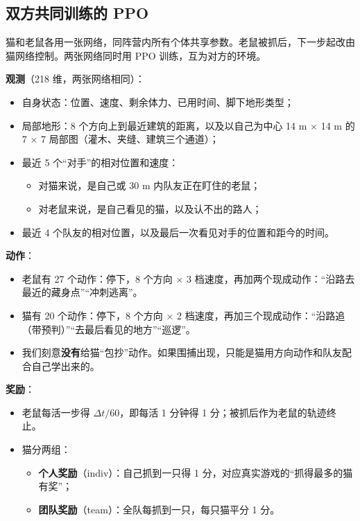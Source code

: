 \documentclass[a4paper,zihao=5,fontset=fandol,UTF8]{ctexart}
\begin{document}
\subsection{双方共同训练的 PPO}
\label{sec:obs}
猫和老鼠各用一张网络，同阵营内所有个体共享参数。老鼠被抓后，下一步起改由猫网络控制。两张网络同时用 PPO\cite{schulman2017ppo} 训练，互为对方的环境。

\textbf{观测}（218 维，两张网络相同）：
\begin{itemize}
  \item 自身状态：位置、速度、剩余体力、已用时间、脚下地形类型；
  \item 局部地形：8 个方向上到最近建筑的距离，以及以自己为中心 14 m × 14 m 的 7 × 7 局部图（灌木、夹缝、建筑三个通道）；
  \item 最近 5 个“对手”的相对位置和速度：
    \begin{itemize}
      \item 对猫来说，是自己或 30 m 内队友正在盯住的老鼠；
      \item 对老鼠来说，是自己看见的猫，以及认不出的路人；
    \end{itemize}
  \item 最近 4 个队友的相对位置，以及最后一次看见对手的位置和距今的时间。
\end{itemize}

\textbf{动作}：
\begin{itemize}
  \item 老鼠有 27 个动作：停下，8 个方向 × 3 档速度，再加两个现成动作：“沿路去最近的藏身点”“冲刺逃离”。
  \item 猫有 20 个动作：停下，8 个方向 × 2 档速度，再加三个现成动作：“沿路追（带预判）”“去最后看见的地方”“巡逻”。
  \item 我们刻意\textbf{没有}给猫“包抄”动作。如果围捕出现，只能是猫用方向动作和队友配合自己学出来的。
\end{itemize}

\textbf{奖励}：
\begin{itemize}
  \item 老鼠每活一步得 $\Delta t/60$，即每活 1 分钟得 1 分；被抓后作为老鼠的轨迹终止。
  \item 猫分两组：
    \begin{itemize}
      \item \textbf{个人奖励}（indiv）：自己抓到一只得 1 分，对应真实游戏的“抓得最多的猫有奖”；
      \item \textbf{团队奖励}（team）：全队每抓到一只，每只猫平分 1 分。
    \end{itemize}
\end{itemize}
\end{document}
